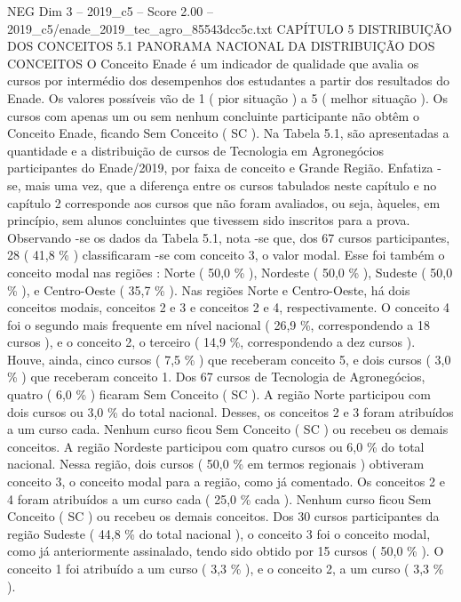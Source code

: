 \begin{textsample}{NEG Dim 3 – 2019\_c5 – Score 2.00 – 2019\_c5/enade\_2019\_tec\_agro\_85543dcc5c.txt}  \label{ex:f3_neg_185}
CAPÍTULO 5 DISTRIBUIÇÃO DOS CONCEITOS 5.1 PANORAMA NACIONAL DA DISTRIBUIÇÃO DOS CONCEITOS O Conceito Enade é um indicador de qualidade que avalia os cursos por intermédio dos desempenhos dos estudantes a partir dos resultados do Enade.
Os valores possíveis vão de 1 ( pior situação ) a 5 ( melhor situação ).
Os cursos com apenas um ou sem nenhum concluinte participante não obtêm o Conceito Enade, ficando Sem Conceito ( SC ).
Na Tabela 5.1, são apresentadas a quantidade e a distribuição de cursos de Tecnologia em Agronegócios participantes do Enade/2019, por faixa de conceito e Grande Região.
Enfatiza -se, mais uma vez, que a diferença entre os cursos tabulados neste capítulo e no capítulo 2 corresponde aos cursos que não foram avaliados, ou seja, àqueles, em princípio, sem alunos concluintes que tivessem sido inscritos para a prova.
Observando -se os dados da Tabela 5.1, nota -se que, dos 67 cursos participantes, 28 ( 41,8 \% ) classificaram -se com conceito 3, o valor modal.
Esse foi também o conceito modal nas regiões : Norte ( 50,0 \% ), Nordeste ( 50,0 \% ), Sudeste ( 50,0 \% ), e Centro-Oeste ( 35,7 \% ).
Nas regiões Norte e Centro-Oeste, há dois conceitos modais, conceitos 2 e 3 e conceitos 2 e 4, respectivamente.
O conceito 4 foi o segundo mais frequente em nível nacional ( 26,9 \%, correspondendo a 18 cursos ), e o conceito 2, o terceiro ( 14,9 \%, correspondendo a dez cursos ).
Houve, ainda, cinco cursos ( 7,5 \% ) que receberam conceito 5, e dois cursos ( 3,0 \% ) que receberam conceito 1.
Dos 67 cursos de Tecnologia de Agronegócios, quatro ( 6,0 \% ) ficaram Sem Conceito ( SC ).
A região Norte participou com dois cursos ou 3,0 \% do total nacional.
Desses, os conceitos 2 e 3 foram atribuídos a um curso cada.
Nenhum curso ficou Sem Conceito ( SC ) ou recebeu os demais conceitos.
A região Nordeste participou com quatro cursos ou 6,0 \% do total nacional.
Nessa região, dois cursos ( 50,0 \% em termos regionais ) obtiveram conceito 3, o conceito modal para a região, como já comentado.
Os conceitos 2 e 4 foram atribuídos a um curso cada ( 25,0 \% cada ).
Nenhum curso ficou Sem Conceito ( SC ) ou recebeu os demais conceitos.
Dos 30 cursos participantes da região Sudeste ( 44,8 \% do total nacional ), o conceito 3 foi o conceito modal, como já anteriormente assinalado, tendo sido obtido por 15 cursos ( 50,0 \% ).
O conceito 1 foi atribuído a um curso ( 3,3 \% ), e o conceito 2, a um curso ( 3,3 \% ).

\end{textsample}
